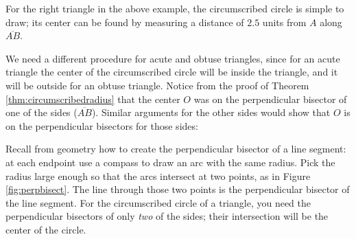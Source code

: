 \newpage
For the right triangle in the above example, the circumscribed circle is simple to draw; its
center can be found by measuring a distance of $2.5$ units from $A$ along $\overline{AB}$.

We need a different procedure for acute and obtuse triangles, since for
an acute triangle the center of the circumscribed circle will be inside the triangle, and it
will be outside for an obtuse triangle. Notice from the proof of Theorem
\ref{thm:circumscribedradius} that the center $O$ was on the perpendicular bisector of one of the
sides ($\overline{AB}$). Similar arguments for the other sides would show that $O$ is on the
perpendicular bisectors for those sides:


\piccaption[]{\label{fig:perpbisect}}
Recall from geometry how to create the
perpendicular bisector of a line segment: at each endpoint use a compass to draw an arc
with the same radius. Pick the radius large enough so that the arcs intersect at two points, as in
Figure \ref{fig:perpbisect}. The line through those two points is the perpendicular bisector of the
line segment. For the circumscribed circle of a triangle, you need the perpendicular bisectors of
only \emph{two} of the sides; their intersection will be the center of the circle.

